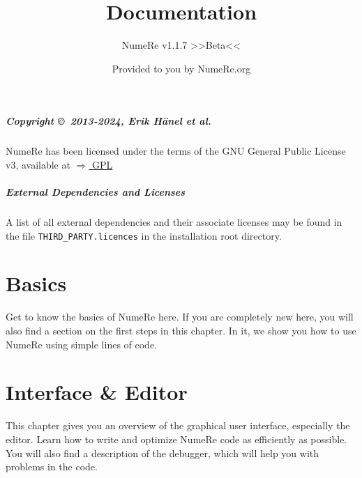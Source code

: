 \documentclass[DIV=17, parskip=half]{scrreprt}
\title{Documentation}
\subtitle{NumeRe v1.1.7 >>Beta<<}
\date{}
\author{\small Provided to you by NumeRe.org}
\begin{document}
    \maketitle
% 
% 
	\tableofcontents
		\paragraph{Copyright \copyright\ 2013-2024, Erik H\"anel \emph{et al.}} 
		NumeRe has been licensed under the terms of the GNU General Public License v3, available at \href{http://www.gnu.org/licenses/gpl.html}{$\Rightarrow$ GPL}
		\paragraph{External Dependencies and Licenses} A list of all external dependencies and their associate licenses may be found in the file \verb!THIRD_PARTY.licences! in the installation root directory.
	\chapter{Basics}
		Get to know the basics of NumeRe here. If you are completely new here, you will also find a section on the first steps in this chapter. In it, we show you how to use NumeRe using simple lines of code.
		
		
		
		
		
		
		
		
		
		
	
	\chapter{Interface \& Editor}
		This chapter gives you an overview of the graphical user interface, especially the editor. Learn how to write and optimize NumeRe code as efficiently as possible. You will also find a description of the debugger, which will help you with problems in the code.
		
		
		
		
		
		
		
		
		
		
		
\end{document}
